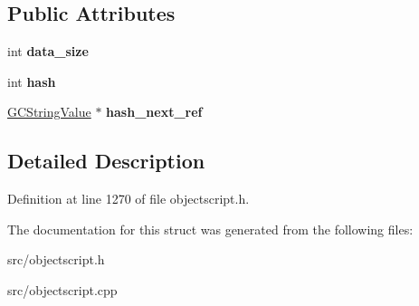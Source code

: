 \subsection*{Public Attributes}
\begin{DoxyCompactItemize}
\item 
int {\bfseries data\+\_\+size}\hypertarget{struct_object_script_1_1_o_s_1_1_core_1_1_g_c_string_value_a06103aca08412f4ce497dfad6615f474}{}\label{struct_object_script_1_1_o_s_1_1_core_1_1_g_c_string_value_a06103aca08412f4ce497dfad6615f474}

\item 
int {\bfseries hash}\hypertarget{struct_object_script_1_1_o_s_1_1_core_1_1_g_c_string_value_a2cee0f3329d930534e862a75b85f964e}{}\label{struct_object_script_1_1_o_s_1_1_core_1_1_g_c_string_value_a2cee0f3329d930534e862a75b85f964e}

\item 
\hyperlink{struct_object_script_1_1_o_s_1_1_core_1_1_g_c_string_value}{G\+C\+String\+Value} $\ast$ {\bfseries hash\+\_\+next\+\_\+ref}\hypertarget{struct_object_script_1_1_o_s_1_1_core_1_1_g_c_string_value_a9e2d525a44ac1fd853ac92db64e0c4a5}{}\label{struct_object_script_1_1_o_s_1_1_core_1_1_g_c_string_value_a9e2d525a44ac1fd853ac92db64e0c4a5}

\end{DoxyCompactItemize}


\subsection{Detailed Description}


Definition at line 1270 of file objectscript.\+h.



The documentation for this struct was generated from the following files\+:\begin{DoxyCompactItemize}
\item 
src/objectscript.\+h\item 
src/objectscript.\+cpp\end{DoxyCompactItemize}
